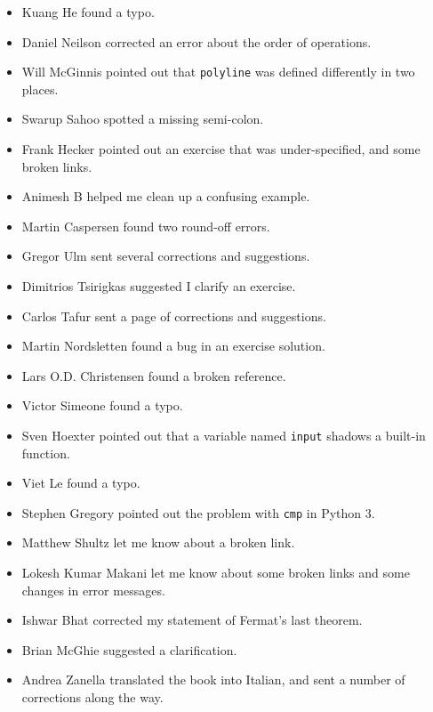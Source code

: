 \documentclass[10pt]{book}
\begin{document}
\begin{itemize}
\item Kuang He found a typo.

\item Daniel Neilson corrected an error about the order of operations.

\item Will McGinnis pointed out that {\tt polyline} was defined
differently in two places.

\item Swarup Sahoo spotted a missing semi-colon.

\item Frank Hecker pointed out an exercise that was under-specified, and
some broken links.

\item Animesh B helped me clean up a confusing example.

\item Martin Caspersen found two round-off errors.

\item Gregor Ulm sent several corrections and suggestions.

\item Dimitrios Tsirigkas suggested I clarify an exercise.

\item Carlos Tafur sent a page of corrections and suggestions.

\item Martin Nordsletten found a bug in an exercise solution.

\item Lars O.D. Christensen found a broken reference.

\item Victor Simeone found a typo.

\item Sven Hoexter pointed out that a variable named {\tt input}
shadows a built-in function.

\item Viet Le found a typo.

\item Stephen Gregory pointed out the problem with {\tt cmp}
in Python 3.

\item Matthew Shultz let me know about a broken link.

\item Lokesh Kumar Makani let me know about some broken links and some
changes in error messages.

\item Ishwar Bhat corrected my statement of Fermat's last theorem.

\item Brian McGhie suggested a clarification.

\item Andrea Zanella translated the book into Italian, and sent a
number of corrections along the way.


\end{itemize}
\end{document}
